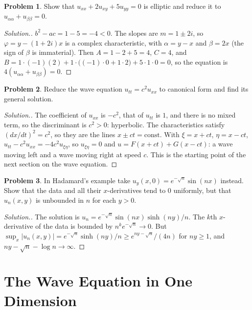 \documentclass[11pt,a4paper]{article}
\numberwithin{equation}{section}
\theoremstyle{definition}
\newtheorem{problemx}{Problem}[subsection]
\newenvironment{problem}{\begin{problemx}}{\end{problemx}}
\newenvironment{solution}
  {\renewcommand{\qedsymbol}{}\begin{proof}[\textit{Solution}.]}
  {\end{proof}}
\begin{document}
\begin{problem}
Show that $u_{xx} + 2u_{xy} + 5u_{yy} = 0$ is elliptic and reduce it to $u_{\alpha\alpha} + u_{\beta\beta} = 0$.
\end{problem}

\begin{solution}
$b^2 - ac = 1 - 5 = -4 < 0$. The slopes are $m = 1 \pm 2i$, so $\varphi = y - (1 + 2i)x$ is a complex characteristic, with $\alpha = y - x$ and $\beta = 2x$ (the sign of $\beta$ is immaterial). Then
$A = 1 - 2 + 5 = 4$, $C = 4$, and $B = 1\cdot(-1)(2) + 1\cdot\bigl((-1)\cdot 0 + 1\cdot 2\bigr) + 5\cdot 1\cdot 0 = 0$, so the equation is $4(u_{\alpha\alpha} + u_{\beta\beta}) = 0$.
\end{solution}

\begin{problem}
Reduce the wave equation $u_{tt} = c^2u_{xx}$ to canonical form and find its general solution.
\end{problem}

\begin{solution}
The coefficient of $u_{xx}$ is $-c^2$, that of $u_{tt}$ is $1$, and there is no mixed term, so the discriminant is $c^2 > 0$: hyperbolic. The characteristics satisfy $(dx/dt)^2 = c^2$, so they are the lines $x \pm ct = \text{const}$. With $\xi = x + ct$, $\eta = x - ct$, $u_{tt} - c^2u_{xx} = -4c^2u_{\xi\eta}$, so $u_{\xi\eta} = 0$ and
$u = F(x + ct) + G(x - ct)$: a wave moving left and a wave moving right at speed $c$. This is the starting point of the next section on the wave equation.
\end{solution}

\begin{problem}
In Hadamard's example take $u_y(x, 0) = e^{-\sqrt n}\sin(nx)$ instead. Show that the data and all their $x$-derivatives tend to $0$ uniformly, but that $u_n(x, y)$ is unbounded in $n$ for each $y > 0$.
\end{problem}

\begin{solution}
The solution is $u_n = e^{-\sqrt n}\sin(nx)\sinh(ny)/n$. The $k$th $x$-derivative of the data is bounded by $n^ke^{-\sqrt n} \to 0$. But $\sup_x|u_n(x, y)| = e^{-\sqrt n}\sinh(ny)/n \geq e^{ny - \sqrt n}/(4n)$ for $ny \geq 1$, and $ny - \sqrt n - \log n \to \infty$.
\end{solution}

\section{The Wave Equation in One Dimension}
\label{sec:wave1d}
\end{document}
